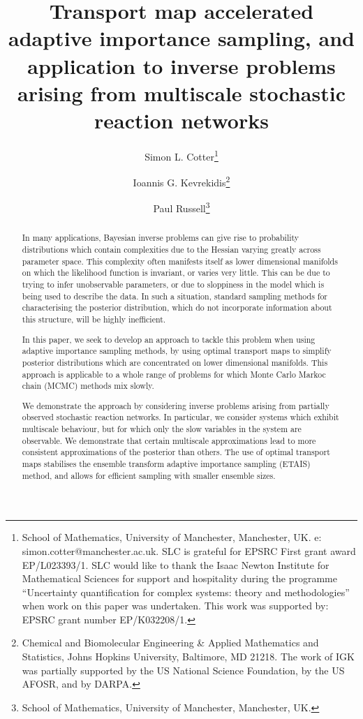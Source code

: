 \documentclass[final]{siamltex}
\author{Simon L. Cotter\thanks{School of
    Mathematics, University of Manchester, Manchester, UK. e:
    simon.cotter@manchester.ac.uk. SLC is grateful for EPSRC First
    grant award EP/L023393/1. SLC would like to thank the Isaac Newton
    Institute for Mathematical Sciences for support and hospitality
    during the programme ``Uncertainty quantification for complex systems: theory and methodologies'' when work on this paper was undertaken. This work was supported by:
EPSRC grant number EP/K032208/1.} \and Ioannis
G. Kevrekidis\thanks{Chemical and Biomolecular Engineering \& Applied
  Mathematics and Statistics, Johns Hopkins University, Baltimore, MD
  21218. The work of IGK was partially supported by the US National
  Science Foundation, by the US AFOSR, and by DARPA.} \and Paul
  Russell\thanks{School of
    Mathematics, University of Manchester, Manchester, UK.}}
\title{Transport map accelerated adaptive importance sampling, and application to inverse problems arising from
  multiscale stochastic reaction networks}
\begin{document}
\maketitle
\begin{abstract}
In many applications, Bayesian inverse problems can give rise to
probability distributions which contain complexities due to the
Hessian varying greatly across parameter space. This complexity often manifests itself as lower
dimensional manifolds on which the likelihood function is
invariant, or varies very little. This can be due to trying to infer
unobservable parameters, or due to sloppiness in the model which is
being used to describe the data. In such a situation, standard
sampling methods for characterising the posterior distribution, which
do not incorporate information about this structure, will be highly
inefficient. 

In this paper, we seek to develop an approach to
tackle this problem when using adaptive importance sampling methods,
by using optimal transport maps to simplify
posterior distributions which are concentrated on lower dimensional
manifolds. This approach is applicable to a whole range of
problems for which Monte Carlo Markoc chain (MCMC) methods mix slowly.

We demonstrate the approach by considering inverse problems arising
from partially observed stochastic reaction networks. In particular,
we consider systems which exhibit multiscale behaviour, but for which
only the slow variables in the system are observable. We demonstrate
that certain multiscale approximations lead to more consistent
approximations of the posterior than others. The use of optimal
transport maps stabilises the ensemble transform adaptive importance
sampling (ETAIS) method, and allows for efficient sampling with
smaller ensemble sizes.
\end{abstract}
\end{document}
